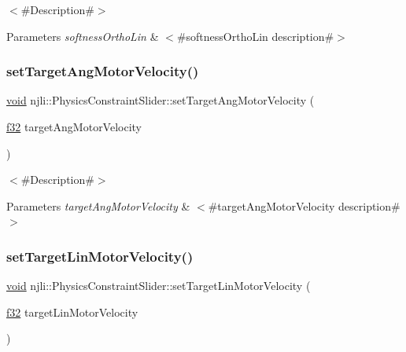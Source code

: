 $<$\#\+Description\#$>$


\begin{DoxyParams}{Parameters}
{\em softness\+Ortho\+Lin} & $<$\#softness\+Ortho\+Lin description\#$>$ \\
\hline
\end{DoxyParams}
\mbox{\label{classnjli_1_1_physics_constraint_slider_a0c5c5803511412299e72f8ab147b6c9e}} 
\subsubsection{\texorpdfstring{set\+Target\+Ang\+Motor\+Velocity()}{setTargetAngMotorVelocity()}}
{\footnotesize\ttfamily \mbox{\hyperlink{_thread_8h_af1e856da2e658414cb2456cb6f7ebc66}{void}} njli\+::\+Physics\+Constraint\+Slider\+::set\+Target\+Ang\+Motor\+Velocity (\begin{DoxyParamCaption}\item[{\mbox{\hyperlink{_util_8h_a5f6906312a689f27d70e9d086649d3fd}{f32}}}]{target\+Ang\+Motor\+Velocity }\end{DoxyParamCaption})}

$<$\#\+Description\#$>$


\begin{DoxyParams}{Parameters}
{\em target\+Ang\+Motor\+Velocity} & $<$\#target\+Ang\+Motor\+Velocity description\#$>$ \\
\hline
\end{DoxyParams}
\mbox{\label{classnjli_1_1_physics_constraint_slider_adb621e16230cb8e01b05738667e9944b}} 
\subsubsection{\texorpdfstring{set\+Target\+Lin\+Motor\+Velocity()}{setTargetLinMotorVelocity()}}
{\footnotesize\ttfamily \mbox{\hyperlink{_thread_8h_af1e856da2e658414cb2456cb6f7ebc66}{void}} njli\+::\+Physics\+Constraint\+Slider\+::set\+Target\+Lin\+Motor\+Velocity (\begin{DoxyParamCaption}\item[{\mbox{\hyperlink{_util_8h_a5f6906312a689f27d70e9d086649d3fd}{f32}}}]{target\+Lin\+Motor\+Velocity }\end{DoxyParamCaption})}


